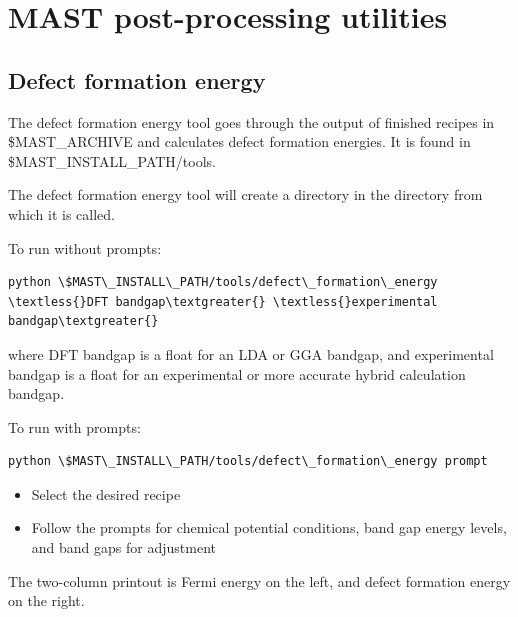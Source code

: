 \documentclass[letterpaper,10pt,english]{sphinxmanual}
\begin{document}
\chapter{MAST post-processing utilities}
\label{6_0_tools:tools}\label{6_0_tools::doc}\label{6_0_tools:mast-post-processing-utilities}

\section{Defect formation energy}
\label{6_0_tools:defect-formation-energy}
The defect formation energy tool goes through the output of finished recipes in \$MAST\_ARCHIVE and calculates defect formation energies. It is found in \$MAST\_INSTALL\_PATH/tools.

The defect formation energy tool will create a  directory in the directory from which it is called.

To run without prompts:

\begin{Verbatim}[commandchars=\\\{\}]
python \$MAST\_INSTALL\_PATH/tools/defect\_formation\_energy \textless{}DFT bandgap\textgreater{} \textless{}experimental bandgap\textgreater{}
\end{Verbatim}

where DFT bandgap is a float for an LDA or GGA bandgap, and experimental bandgap is a float for an experimental or more accurate hybrid calculation bandgap.

To run with prompts:

\begin{Verbatim}[commandchars=\\\{\}]
python \$MAST\_INSTALL\_PATH/tools/defect\_formation\_energy prompt
\end{Verbatim}
\begin{itemize}
\item {} 
Select the desired recipe

\item {} 
Follow the prompts for chemical potential conditions, band gap energy levels, and band gaps for adjustment

\end{itemize}

The two-column printout is Fermi energy on the left, and defect formation energy on the right.
\end{document}
